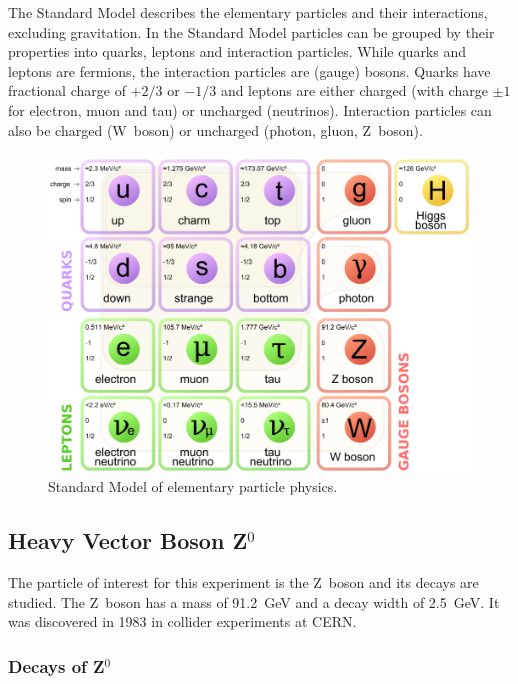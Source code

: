 \documentclass[11pt, a4paper]{article}
\numberwithin{equation}{section}
\begin{document}
The Standard Model describes the elementary particles and their interactions, excluding gravitation.
In the Standard Model particles can be grouped by their properties into quarks, leptons and interaction particles.
While quarks and leptons are fermions, the interaction particles are (gauge) bosons.
Quarks have fractional charge of $+2/3$ or $-1/3$ and leptons are either charged (with charge $\pm1$ for electron, muon and tau) or uncharged (neutrinos).
Interaction particles can also be charged (W~boson) or uncharged (photon, gluon, Z~boson).
\begin{figure}[h]
	\centering
	\includegraphics[width=.8\textwidth]{./figures/theory/standardmodel}
	\caption{Standard Model of elementary particle physics\protect\footnotemark.}
	\label{fig:standard_model}
\end{figure}

\subsection{Heavy Vector Boson Z$^0$}

The particle of interest for this experiment is the Z~boson and its decays are studied.
The Z~boson has a mass of \SI{91.2}{GeV} and a decay width of \SI{2.5}{GeV}.
It was discovered in 1983 in collider experiments at CERN.

\subsubsection{Decays of Z$^0$}
\end{document}
